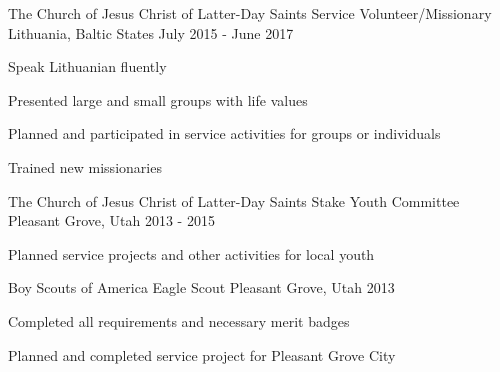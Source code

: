 

\begin{cventries}

  \cventry
    {The Church of Jesus Christ of Latter-Day Saints} %
    {Service Volunteer/Missionary} %
    {Lithuania, Baltic States} %
    {July 2015 - June 2017} %
    {
      \begin{cvitems} %
        \item {Speak Lithuanian fluently}
        \item {Presented large and small groups with life values}
        \item {Planned and participated in service activities for groups or individuals}
        \item {Trained new missionaries}
      \end{cvitems}
    }

  \cventry
    {The Church of Jesus Christ of Latter-Day Saints} %
    {Stake Youth Committee} %
    {Pleasant Grove, Utah} %
    {2013 - 2015} %
    {
      \begin{cvitems} %
        \item {Planned service projects and other activities for local youth}
      \end{cvitems}
    }

  \cventry
    {Boy Scouts of America} %
    {Eagle Scout} %
    {Pleasant Grove, Utah} %
    {2013} %
    {
      \begin{cvitems} %
        \item {Completed all requirements and necessary merit badges}
        \item {Planned and completed service project for Pleasant Grove City}
      \end{cvitems}
    }

\end{cventries}
